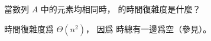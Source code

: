 \startEXERCISE
當數列 $A$ 中的元素均相同時，  的時間復雜度是什麼？
\stopEXERCISE

\startANSWER
時間復雜度爲 $\Theta(n^2)$，
因爲  時總有一邊爲空（參見）。
\stopANSWER
